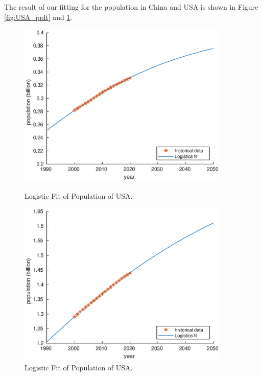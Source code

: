 \documentclass[12pt]{article}
\begin{document}
The result of our fitting for the population in China and USA is shown in Figure \ref{fig:USA_pplt} and \ref{fig:China_pplt}.
\begin{figure}[htbp]
    \centering
    \begin{minipage}[t]{0.48\textwidth}
        \centering
        \includegraphics[width=0.9\textwidth]{figure/model/USA/USA_pplt.eps}
        \caption{Logistic Fit of Population of USA.\label{fig:USA_pplt}}
    \end{minipage}
    \begin{minipage}[t]{0.48\textwidth}
        \centering
        \includegraphics[width=0.9\textwidth]{figure/model/China/China_pplt.eps}
        \caption{Logistic Fit of Population of USA.\label{fig:China_pplt}}
    \end{minipage}
\end{figure}
\end{document}
